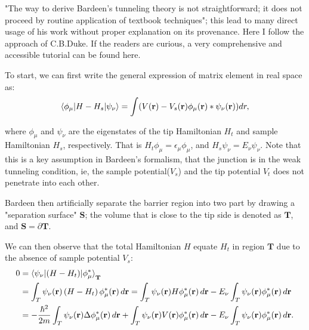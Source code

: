 "The way to derive Bardeen's tunneling theory is not straightforward; it does not proceed by routine application of textbook techniques"\cite{gottliebBardeensTunnelingTheory}; this lead to many direct usage of his work without proper explanation on its provenance. Here I follow the approach of C.B.Duke\cite{dukeTunnelingSolids1973}. If the readers are curious, a very comprehensive and accessible tutorial can be found here\cite{gottliebBardeensTunnelingTheory}. 

To start, we can first write the general expression of matrix element in real space as: 
\begin{equation}
	\label{eq:bardeen_1}
	\braket{\phi_{\mu}|H-H_s|\psi_{\nu}} = \int(V(\mathbf{r})- V_s(\mathbf{r})\phi_{\mu}(\mathbf{r})*\psi_{\nu}(\mathbf{r}))dr,
\end{equation}

where $\phi_{\mu}$ and $\psi_{\nu}$ are the eigenstates of the tip Hamiltonian $H_t$ and sample Hamiltonian $H_s$, respectively. That is $H_t \phi_{\mu} = \epsilon_{\mu} \phi_{\mu}$, and $H_s \psi_{\nu} = E_{\nu} \psi_{\nu}$. Note that this is a key assumption in Bardeen's formalism, that the junction is in the weak tunneling condition, ie, the sample potential($V_s$) and the tip potential $V_t$ does not penetrate into each other. 

Bardeen then artificially separate the barrier region into two part by drawing a "separation surface" $\mathbf{S}$; the volume that is close to the tip side is denoted as $\mathbf{T}$, and $\mathbf{S} = \partial \mathbf{T}$.

We can then observe that the total Hamiltonian $H$ equate $H_t$ in region $\mathbf{T}$ due to the absence of sample potential $V_s$: 
\begin{equation}
	\label{eq:bardeen_2}
	\begin{aligned}
		0 &= \braket{\psi_{\nu}|(H-H_t)|\phi_{\mu}^*}_{\mathbf{T}}\\
		 &= \int_{T} \psi_{\nu}(\mathbf{r}) \left( H - H_{t} \right) \phi_{\mu}^*(\mathbf{r}) \, d\mathbf{r} 
		= \int_{T} \psi_{\nu}(\mathbf{r}) H \phi_{\mu}^*(\mathbf{r}) \, d\mathbf{r} 
		- E_{\nu} \int_{T} \psi_{\nu}(\mathbf{r}) \phi_{\mu}^*(\mathbf{r}) \, d\mathbf{r} \\
		&= -\frac{\hslash^2}{2m} \int_{T} \psi_{\nu}(\mathbf{r}) \Delta \phi_{\mu}^*(\mathbf{r}) \, d\mathbf{r} 
		+ \int_{T} \psi_{\nu}(\mathbf{r}) V(\mathbf{r}) \phi_{\mu}^*(\mathbf{r}) \, d\mathbf{r} 
		- E_{\nu} \int_{T} \psi_{\nu}(\mathbf{r}) \phi_{\mu}^*(\mathbf{r}) \, d\mathbf{r}.
	\end{aligned}
\end{equation}

